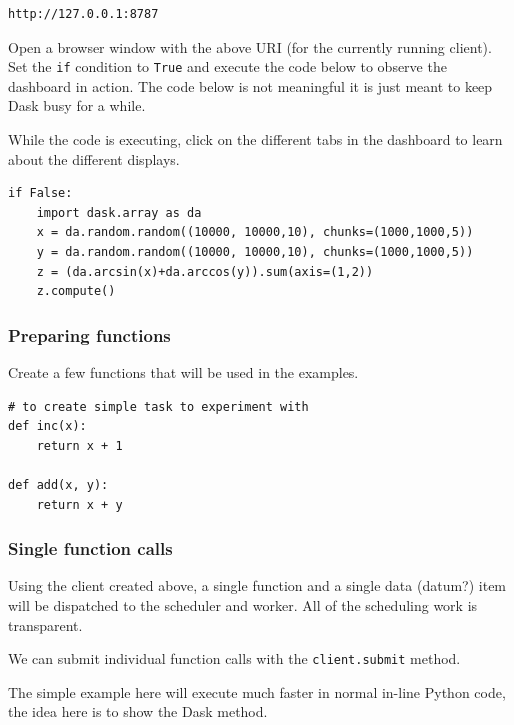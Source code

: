 \begin{lstlisting}[style=outcellstyle]
http://127.0.0.1:8787

\end{lstlisting}

Open a browser window with the above URI (for the currently running client). Set the \verb+if+ condition to \verb+True+ and execute the code below to observe the dashboard in action.
The code below is not meaningful it is just meant to keep Dask busy for a while.


While the code is executing, click on the different tabs in the dashboard to learn about the different displays.



\begin{lstlisting}[style=incellstyle]
if False:
    import dask.array as da
    x = da.random.random((10000, 10000,10), chunks=(1000,1000,5))
    y = da.random.random((10000, 10000,10), chunks=(1000,1000,5))
    z = (da.arcsin(x)+da.arccos(y)).sum(axis=(1,2))
    z.compute()
\end{lstlisting}


\subsubsection{Preparing functions}
\label{sec:Preparingfunctions}

Create a few functions that will be used in the examples.



\begin{lstlisting}[style=incellstyle]
# to create simple task to experiment with
def inc(x):
    return x + 1

def add(x, y):
    return x + y

\end{lstlisting}


\subsubsection{Single function calls}
\label{sec:Singlefunctioncalls}

Using the client created above, a single function and a single data (datum?) item will be dispatched to the scheduler and worker. All of the scheduling work is transparent.


We can submit individual function calls with the \verb+client.submit+ method.


The simple example here will execute much faster in normal in-line Python code, the idea here is to show the Dask method.


